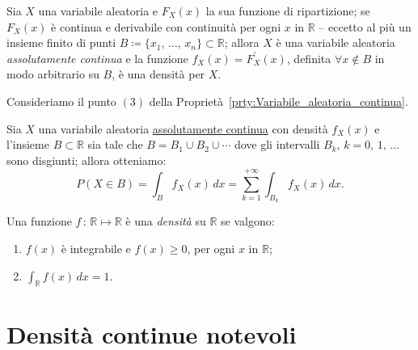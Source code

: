 \begin{prty}
\begin{prty}
                Sia $X$ una variabile aleatoria e $F_X(x)$ la sua funzione di ripartizione; se $F_X(x)$ è continua e derivabile con continuità per ogni $x$ in $\mathbb{R}$ \--- eccetto al più un insieme finito di punti $B \coloneqq \{x_1,\,\ldots,\, x_n\} \subset \mathbb{R}$; allora $X$ è una variabile aleatoria \textit{assolutamente continua} e la funzione $f_X(x) = F^{\prime}_X(x)$, definita $\forall x \notin B$ in modo arbitrario su $B$, è una densità per $X$.
            \end{prty}
            \begin{obsv}
                Consideriamo il punto $(3)$ della Proprietà~\ref{prty:Variabile_aleatoria_continua}.

                Sia $X$ una variabile aleatoria \underline{assolutamente continua} con densità $f_X(x)$ e l'insieme $B \subset \mathbb{R}$ sia tale che $B = B_1 \cup B_2 \cup \dotsm$ dove gli intervalli $B_k,\, k = 0,\,1,\,\ldots$ sono disgiunti; allora otteniamo: \[
                    P(X \in B) = \int_{B} f_X(x)\, dx = \sum_{k=1}^{+\infty} \int_{B_k} f_X(x)\, dx
                .\] 
            \end{obsv}
            \begin{obsv}
                Una funzione $f\,:\, \mathbb{R} \mapsto \mathbb{R}$ è una \textit{densità} su $\mathbb{R}$ se valgono:
                \begin{enumerate}
                    \item $f(x)$ è integrabile e $f(x) \geq 0$, per ogni $x$ in $\mathbb{R}$;
                    \item $\int_{\mathbb{R}} f(x)\, dx = 1$.
                \end{enumerate}
            \end{obsv}
        \end{prty}
    \section{Densità continue notevoli}
